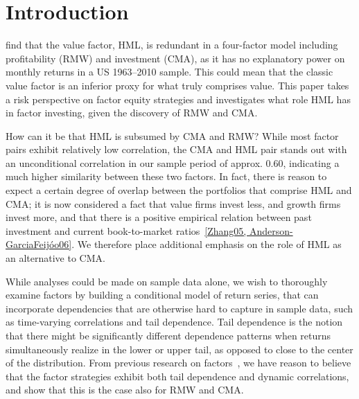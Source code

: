 \section{Introduction}
\textcite{FF2015} find that the value factor, HML, is redundant in a four-factor model including profitability (RMW) and investment (CMA), as it has no explanatory power on monthly returns in a US 1963–2010 sample. This could mean that the classic value factor is an inferior proxy for what truly comprises value. This paper takes a risk perspective on factor equity strategies and investigates what role HML has in factor investing, given the discovery of RMW and CMA. 

How can it be that HML is subsumed by CMA and RMW? While most factor pairs exhibit relatively low correlation, the CMA and HML pair stands out with an unconditional correlation in our sample period of approx. 0.60, indicating a much higher similarity between these two factors. In fact, there is reason to expect a certain degree of overlap between the portfolios that comprise HML and CMA; it is now considered a fact that value firms invest less, and growth firms invest more, and that there is a positive empirical relation between past investment and current book-to-market ratios~\autoref{Zhang05, Anderson-GarciaFeijóo06}. We therefore place additional emphasis on the role of HML as an alternative to CMA.

While analyses could be made on sample data alone, we wish to thoroughly examine factors by building a conditional model of return series, that can incorporate dependencies that are otherwise hard to capture in sample data, such as time-varying correlations and tail dependence. Tail dependence is the notion that there might be significantly different dependence patterns when returns simultaneously realize in the lower or upper tail, as opposed to close to the center of the distribution. From previous research on factors~\autocite{ChristoffersenLanglois2013}, we have reason to believe that the factor strategies exhibit both tail dependence and dynamic correlations, and show that this is the case also for RMW and CMA.

